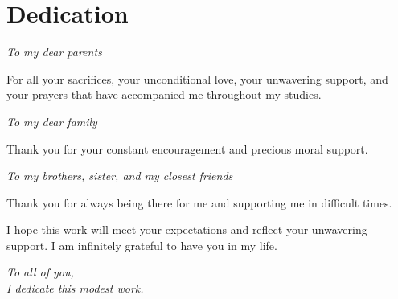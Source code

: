 \chapter*{Dedication}

\vspace{2cm}

\begin{center}
    \textit{To my dear parents}
\end{center}

\vspace{0.5cm}

For all your sacrifices, your unconditional love, your unwavering support, and your prayers that have accompanied me throughout my studies.

\vspace{1cm}

\begin{center}
    \textit{To my dear family}
\end{center}

\vspace{0.5cm}

Thank you for your constant encouragement and precious moral support.

\vspace{1cm}

\begin{center}
    \textit{To my brothers, sister, and my closest friends}
\end{center}

\vspace{0.5cm}

Thank you for always being there for me and supporting me in difficult times.

\vspace{1cm}

I hope this work will meet your expectations and reflect your unwavering support. I am infinitely grateful to have you in my life.

\vspace{1.5cm}

\begin{center}
    \textit{To all of you,}\\
    \textit{I dedicate this modest work.}
\end{center}

\vspace{3cm}